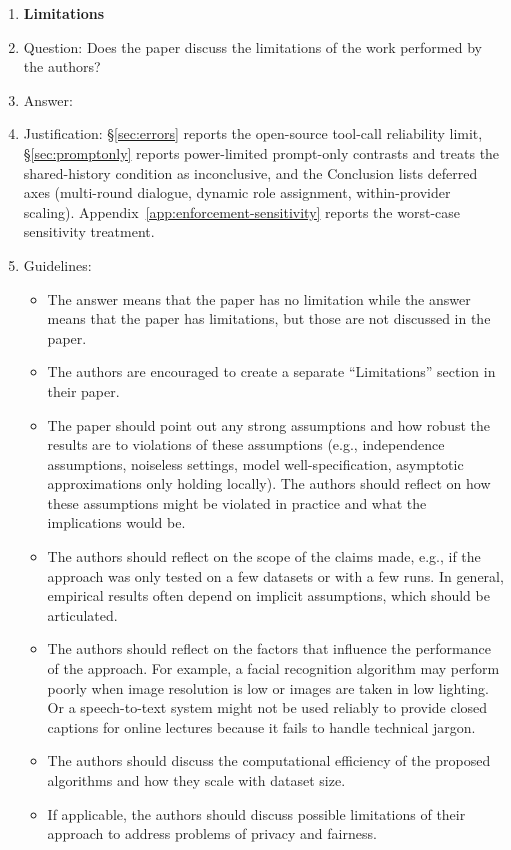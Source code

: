 \begin{enumerate}
\item {\bf Limitations}
    \item[] Question: Does the paper discuss the limitations of the work performed by the authors?
    \item[] Answer: \answerYes{}
    \item[] Justification: \S\ref{sec:errors} reports the open-source tool-call reliability limit, \S\ref{sec:promptonly} reports power-limited prompt-only contrasts and treats the shared-history condition as inconclusive, and the Conclusion lists deferred axes (multi-round dialogue, dynamic role assignment, within-provider scaling). Appendix~\ref{app:enforcement-sensitivity} reports the worst-case sensitivity treatment.
    \item[] Guidelines:
    \begin{itemize}
        \item The answer \answerNA{} means that the paper has no limitation while the answer \answerNo{} means that the paper has limitations, but those are not discussed in the paper. 
        \item The authors are encouraged to create a separate ``Limitations'' section in their paper.
        \item The paper should point out any strong assumptions and how robust the results are to violations of these assumptions (e.g., independence assumptions, noiseless settings, model well-specification, asymptotic approximations only holding locally). The authors should reflect on how these assumptions might be violated in practice and what the implications would be.
        \item The authors should reflect on the scope of the claims made, e.g., if the approach was only tested on a few datasets or with a few runs. In general, empirical results often depend on implicit assumptions, which should be articulated.
        \item The authors should reflect on the factors that influence the performance of the approach. For example, a facial recognition algorithm may perform poorly when image resolution is low or images are taken in low lighting. Or a speech-to-text system might not be used reliably to provide closed captions for online lectures because it fails to handle technical jargon.
        \item The authors should discuss the computational efficiency of the proposed algorithms and how they scale with dataset size.
        \item If applicable, the authors should discuss possible limitations of their approach to address problems of privacy and fairness.

\end{itemize}
\end{enumerate}
